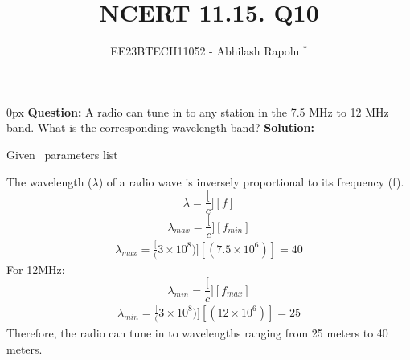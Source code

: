 \documentclass[journal,12pt,twocolumn]{IEEEtran}
\begin{document}

\vspace{3cm}
\title{NCERT 11.15. Q10}
\author{EE23BTECH11052 - Abhilash Rapolu $^{*}$%
}
\maketitle
\newpage
\bigskip
\renewcommand{\thetable}{\arabic{table}}

\parindent 0px
\textbf{Question:} A radio can tune in to any station in the 7.5 MHz to 12 MHz band.
 What is the corresponding wavelength band? 
\textbf{Solution:}  
\begin{table}[htbp] \small
\centering

\caption{Given \, parameters list}\end{table}
The wavelength ($\lambda$) of a radio wave is inversely proportional to its frequency (f).
\bgroup \obeylines
$$\lambda=\frac[c][f]$$
$$\lambda_{max}=\frac[c][f_{min}]$$
\egroup
\begin{align}
\lambda_{max}=\frac[(3\times10^{8})][(7.5\times10^{6})]=40
\end{align}
For 12MHz:
$$\lambda_{min}=\frac[c][f_{max}]$$
\begin{align}
\lambda_{min}=\frac[(3\times10^{8})][(12\times10^{6})]=25
\end{align}
Therefore, the radio can tune in to wavelengths ranging from 25 meters to 40 meters.
\end{document}

